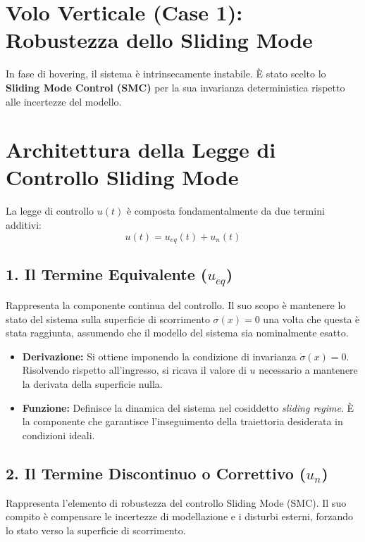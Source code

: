 \documentclass[12pt,a4paper]{article}
\begin{document}
\section{Volo Verticale (Case 1): Robustezza dello Sliding Mode}
In fase di hovering, il sistema è intrinsecamente instabile. È stato scelto lo \textbf{Sliding Mode Control (SMC)} per la sua invarianza deterministica rispetto alle incertezze del modello.

\section*{Architettura della Legge di Controllo Sliding Mode}

La legge di controllo $u(t)$ è composta fondamentalmente da due termini additivi:
\begin{equation}
    u(t) = u_{eq}(t) + u_{n}(t)
\end{equation}

\subsection*{1. Il Termine Equivalente ($u_{eq}$)}
Rappresenta la componente continua del controllo. Il suo scopo è mantenere lo stato del sistema sulla superficie di scorrimento $\sigma(x) = 0$ una volta che questa è stata raggiunta, assumendo che il modello del sistema sia nominalmente esatto.

\begin{itemize}
    \item \textbf{Derivazione:} Si ottiene imponendo la condizione di invarianza $\dot{\sigma}(x) = 0$. Risolvendo rispetto all'ingresso, si ricava il valore di $u$ necessario a mantenere la derivata della superficie nulla.
    \item \textbf{Funzione:} Definisce la dinamica del sistema nel cosiddetto \textit{sliding regime}. È la componente che garantisce l'inseguimento della traiettoria desiderata in condizioni ideali.
\end{itemize}

\subsection*{2. Il Termine Discontinuo o Correttivo ($u_{n}$)}
Rappresenta l'elemento di robustezza del controllo Sliding Mode (SMC). Il suo compito è compensare le incertezze di modellazione e i disturbi esterni, forzando lo stato verso la superficie di scorrimento.
\end{document}
